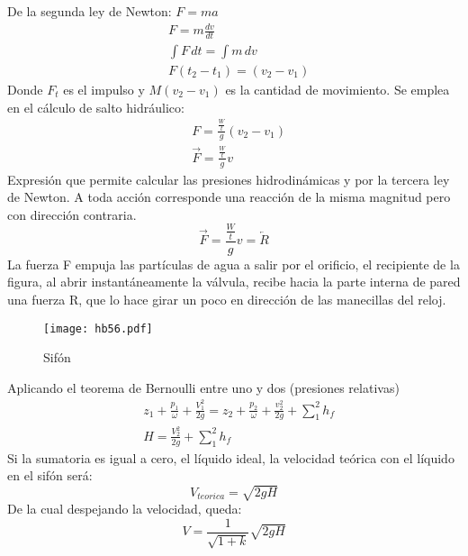 De la segunda ley de Newton: $F=ma$
\begin{align*}
    &F = m \frac{dv}{dt}\\
    &\int F\,dt =\int m\,dv\\
    &F\left( t_2 - t_1 \right) = \left( v_2 - v_1 \right)
\end{align*}
Donde $F_t$ es el impulso y $M(v_2-v_1)$ es la cantidad de movimiento. Se emplea en el cálculo de salto hidráulico:
\begin{align*}
    &F = \frac{\frac{W}{t}}{g}\left(v_2 - v_1\right)\\
    &\vec{F} = \frac{\frac{W}{t}}{g}v
\end{align*}
Expresión que permite calcular las presiones hidrodinámicas y por la tercera ley de Newton. A toda acción corresponde una reacción de la misma magnitud pero con dirección contraria.
\begin{equation}
    \vec{F} =\frac{\frac{W}{t}}{g}v =\overleftarrow{R} 
\end{equation}
La fuerza F empuja las partículas de agua a salir por el orificio, el recipiente de la figura, al abrir instantáneamente la válvula, recibe hacia la parte interna de pared una fuerza R, que lo hace girar un poco en dirección de las manecillas del reloj.

\begin{figure}[h!]
\centering
  \texttt{[image: hb56.pdf]}
  \caption{Sifón}
  \label{hb56}
\end{figure}    

Aplicando el teorema de Bernoulli entre uno y dos (presiones relativas)
\begin{align*}
        &z_1 + \frac{p_1}{\omega} + \frac{V_1^2}{2g} = z_2 + \frac{p_2}{\omega} + \frac{v_2^2}{2g} +\sum_1^2 h_f\\
        &H = \frac{V_2^2}{2g} + \sum_1^2 h_f
\end{align*}
Si la sumatoria es igual a cero, el líquido ideal, la velocidad teórica con el líquido en el sifón será:
\begin{equation}
    V_{teorica} = \sqrt{2gH}
\end{equation}
De la cual despejando la velocidad, queda:
\begin{equation}
    V = \frac{1}{\sqrt{1 + k}}\sqrt{2gH}
\end{equation}

